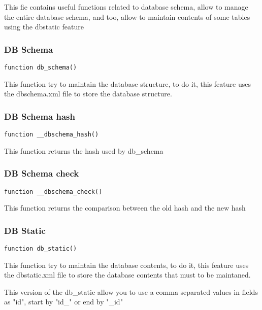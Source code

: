 \documentclass[a4paper]{article}
\begin{document}
This fie contains useful functions related to database schema, allow to manage the entire database
schema, and too, allow to maintain contents of some tables using the dbstatic feature

\hypertarget{toc407}{}
\subsubsection{DB Schema}

\begin{lstlisting}
function db_schema()
\end{lstlisting}

This function try to maintain the database structure, to do it, this feature uses the dbschema.xml
file to store the database structure.

\hypertarget{toc408}{}
\subsubsection{DB Schema hash}

\begin{lstlisting}
function __dbschema_hash()
\end{lstlisting}

This function returns the hash used by db\_schema

\hypertarget{toc409}{}
\subsubsection{DB Schema check}

\begin{lstlisting}
function __dbschema_check()
\end{lstlisting}

This function returns the comparison between the old hash and the new hash

\hypertarget{toc410}{}
\subsubsection{DB Static}

\begin{lstlisting}
function db_static()
\end{lstlisting}

This function try to maintain the database contents, to do it, this feature
uses the dbstatic.xml file to store the database contents that must to be
maintaned.

This version of the db\_static allow you to use a comma separated values in
fields as "id", start by "id\_" or end by "\_id"
\end{document}
